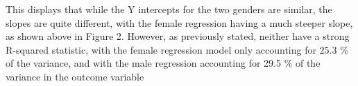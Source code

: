 \documentclass[12pt,letterpaper]{article}
\begin{document}
\begin{enumerate}
	\noindent This displays that while the Y intercepts for the two genders are similar, the slopes are quite different, with the female regression having a much steeper slope, as shown above in Figure 2. However, as previously stated, neither have a strong R-squared statistic, with the female regression model only accounting for 25.3 \% of the variance, and with the male regression accounting for 29.5 \% of the variance in the outcome variable 

\end{enumerate}
\end{document}
